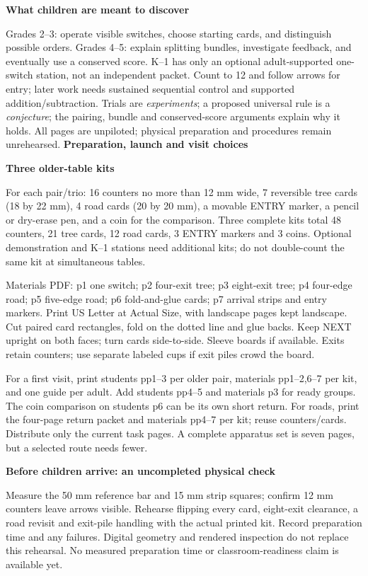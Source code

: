 \documentclass[11pt]{article}
\newcommand{\head}[1]{\vspace{3pt}\textbf{\large #1}\par}
\newcommand{\prob}[1]{\vspace{3pt}\textbf{#1}\par}
\begin{document}
\prob{What children are meant to discover}
Grades 2--3: operate visible switches, choose starting cards, and distinguish possible orders. Grades 4--5: explain splitting bundles, investigate feedback, and eventually use a conserved score. K--1 has only an optional adult-supported one-switch station, not an independent packet. Count to 12 and follow arrows for entry; later work needs sustained sequential control and supported addition/subtraction. Trials are \emph{experiments}; a proposed universal rule is a \emph{conjecture}; the pairing, bundle and conserved-score arguments explain why it holds. All pages are unpiloted; physical preparation and procedures remain unrehearsed.
\newpage
\head{Preparation, launch and visit choices}
\prob{Three older-table kits}
For each pair/trio: 16 counters no more than 12 mm wide, 7 reversible tree cards (18 by 22 mm), 4 road cards (20 by 20 mm), a movable ENTRY marker, a pencil or dry-erase pen, and a coin for the comparison. Three complete kits total 48 counters, 21 tree cards, 12 road cards, 3 ENTRY markers and 3 coins. Optional demonstration and K--1 stations need additional kits; do not double-count the same kit at simultaneous tables.

Materials PDF: p1 one switch; p2 four-exit tree; p3 eight-exit tree; p4 four-edge road; p5 five-edge road; p6 fold-and-glue cards; p7 arrival strips and entry markers. Print US Letter at Actual Size, with landscape pages kept landscape. Cut paired card rectangles, fold on the dotted line and glue backs. Keep NEXT upright on both faces; turn cards side-to-side. Sleeve boards if available. Exits retain counters; use separate labeled cups if exit piles crowd the board.

For a first visit, print students pp1--3 per older pair, materials pp1--2,6--7 per kit, and one guide per adult. Add students pp4--5 and materials p3 for ready groups. The coin comparison on students p6 can be its own short return. For roads, print the four-page return packet and materials pp4--7 per kit; reuse counters/cards. Distribute only the current task pages. A complete apparatus set is seven pages, but a selected route needs fewer.

\prob{Before children arrive: an uncompleted physical check}
Measure the 50 mm reference bar and 15 mm strip squares; confirm 12 mm counters leave arrows visible. Rehearse flipping every card, eight-exit clearance, a road revisit and exit-pile handling with the actual printed kit. Record preparation time and any failures. Digital geometry and rendered inspection do not replace this rehearsal. No measured preparation time or classroom-readiness claim is available yet.
\end{document}
